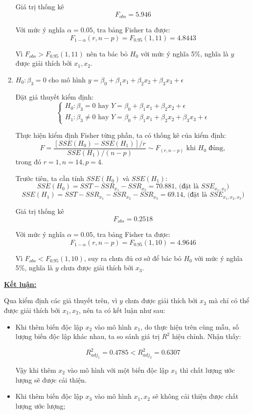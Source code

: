 \documentclass[a4paper]{article}
\theoremstyle{nonumberplain}
\begin{document}
\begin{enumerate}[label=(\roman*)]
	Giá trị thống kê $$F_{obs} = 5.946$$
	
	Với mức ý nghĩa $\alpha = 0.05$, tra bảng Fisher ta được:
	$$F_{1-\alpha}(r,n-p) = F_{0.95}(1,11) = 4.8443$$
	
	Vì $F_{obs}>F_{0.95}(1,11)$ nên ta bác bỏ $H_0$ với mức ý nghĩa 5\%, nghĩa là $y$ được giải thích bởi $x_1,x_2$.
	
	\item $H_0: \beta_3 = 0$ cho mô hình $y = \beta_0 + \beta_1x_1 + \beta_2x_2 + \beta_3x_3 + \epsilon$
	
	Đặt giả thuyết kiểm định:
	\[\begin{cases}
		H_0 : \beta_3 = 0 \text{ hay } Y = \beta_0 + \beta_1 x_1 + \beta_2 x_2 + \epsilon \\
		H_1 : \beta_3 \ne 0 \text{ hay } Y = \beta_0 + \beta_1 x_1 + \beta_2 x_2 + \beta_3 x_3 + \epsilon 
	\end{cases}\]

	Thực hiện kiểm định Fisher từng phần, ta có thống kê của kiểm định: 
	$$F = \displaystyle \frac{\left [ SSE (H_0) - SSE(H_1) \right ] / r}{SSE(H_1)/(n-p)} \sim F_{(r,n-p)} \text{ khi } H_0 \text{ đúng},$$
	trong đó $r = 1, n = 14, p = 4$.
	
	Trước tiên, ta cần tính $SSE (H_0)$ và $SSE(H_1)$:
	$$SSE(H_0) = SST - SSR_{x_1} - SSR_{x_2} = 70.881 \text{, (đặt là }  SSE_{x_1,x_2}) $$
	$$SSE(H_1) = SST - SSR_{x_1} - SSR_{x_2} - SSR_{x_3} = 69.14 \text{, (đặt là }  SSE_{x_1,x_2,x_3})$$
	
	Giá trị thống kê $$F_{obs} = 0.2518$$
	
	Với mức ý nghĩa $\alpha = 0.05$, tra bảng Fisher ta được:
	$$F_{1-\alpha}(r,n-p) = F_{0.95}(1,10) = 4.9646$$
	
	Vì $F_{obs}<F_{0.95}(1,10)$, suy ra chưa đủ cơ sở để bác bỏ $H_0$ với mức ý nghĩa 5\%, nghĩa là $y$ chưa được giải thích bởi $x_3$.
\end{enumerate}

\textbf{\underline{Kết luận:}}

Qua kiểm định các giả thuyết trên, vì $y$ chưa được giải thích bởi $x_3$ mà chỉ có thể được giải thích bởi $x_1, x_2$, nên ta có kết luận như sau:
\begin{itemize}
	\item Khi thêm biến độc lập $x_2$ vào mô hình $x_1$, do thực hiện trên cùng mẫu, số lượng biến độc lập khác nhau, ta so sánh giá trị $R^2$ hiệu chỉnh. Nhận thấy:
	
	\[R^2_{adj_1} = 0.4785 < R^2_{adj_2} = 0.6307\]
	
	Vậy khi thêm $x_2$ vào mô hình với một biến độc lập $x_1$ thì chất lượng ước lượng sẽ được cải thiện.
	
	\item Khi thêm biến độc lập $x_3$ vào mô hình $x_1,x_2$ sẽ không cải thiện được chất lượng ước lượng;
\end{itemize}
\end{document}
